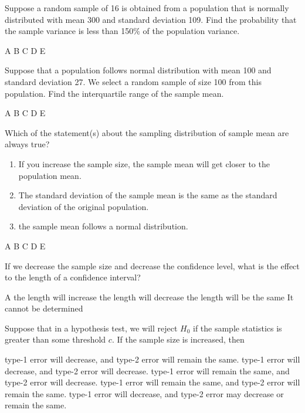 \documentclass[letterpaper,10pt,addpoints]{exam}
\begin{document}
\begin{questions}
\question Suppose a random sample of 16 is obtained from a population that is normally distributed with mean 300 and standard deviation 109. Find the probability that the sample variance is less than 150\% of the population variance. 
\begin{choices}
  \choice A
  \choice B
  \choice C
  \choice D
  \choice E
\end{choices}

\question Suppose that a population follows normal distribution with mean 100 and standard deviation 27. We select a random sample of size 100 from this population. Find the interquartile range of the sample mean. 
\begin{choices}
  \choice A
  \choice B
  \choice C
  \choice D
  \choice E
\end{choices}


\question Which of the statement(s) about the sampling distribution of sample mean are always true?
\begin{enumerate}[I]
  \item If you increase the sample size, the sample mean will get closer to the population mean.
  \item The standard deviation of the sample mean is the same as the standard deviation of the original population.
  \item the sample mean follows a normal distribution.
\end{enumerate}
\begin{choices}
  \choice A
  \choice B
  \choice C
  \choice D
  \choice E
\end{choices}


\question If we decrease the sample size and decrease the confidence level, what is the effect to the length of a confidence interval?
\begin{choices}
  \choice A
  \choice the length will increase
  \choice the length will decrease
  \choice the length will be the same
  \choice It cannot be determined
\end{choices}

\question Suppose that in a hypothesis test, we will reject $H_0$ if the sample statistics is greater than some threshold $c$. If the sample size is increased, then 
\begin{choices}
  \choice type-1 error will decrease, and type-2 error will remain the same.
  \correctchoice type-1 error will decrease, and type-2 error will decrease.
  \choice type-1 error will remain the same, and type-2 error will decrease.
  \choice type-1 error will remain the same, and type-2 error will remain the same.
  \choice type-1 error will decrease, and type-2 error may decrease or remain the same.
\end{choices}


\end{questions}
\end{document}
